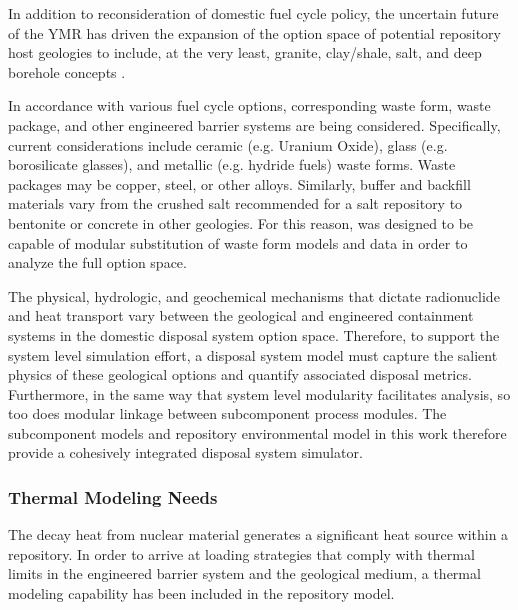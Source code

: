 

In addition to reconsideration of domestic fuel cycle policy, the uncertain 
future of the \gls{YMR} has driven the expansion of the option space of 
potential repository host geologies to include, at the very least, granite, 
clay/shale, salt, and deep borehole concepts \cite{nutt_used_2010}. 


In accordance with various fuel cycle options, corresponding waste form, waste 
package, and other engineered barrier systems are being considered.  
Specifically, current considerations include ceramic (e.g.  Uranium Oxide), 
glass (e.g.  borosilicate glasses), and metallic (e.g.  hydride fuels) waste 
forms. Waste packages may be copper, steel, or other alloys. Similarly, buffer 
and backfill materials vary from the crushed salt recommended for a salt 
repository to bentonite or concrete in other geologies. For this reason, \Cyder
was designed to be capable of modular substitution of waste form models and data
in order to analyze the full option space.


The physical, hydrologic, and geochemical mechanisms that dictate 
radionuclide and heat transport vary between the geological and engineered 
containment systems in the domestic disposal system option space.  Therefore, 
to support the system level simulation effort, a disposal system model must
capture the salient physics of these geological options and quantify associated 
disposal metrics.  Furthermore, in the same way that system level 
modularity facilitates analysis, so too does modular linkage between subcomponent 
process modules. The subcomponent models and repository environmental model in 
this work therefore provide a cohesively integrated disposal system simulator.


\subsubsection{Thermal Modeling Needs}
The decay heat from nuclear material generates a significant heat source within a 
repository. In order to arrive at loading strategies that comply with thermal 
limits in the engineered barrier system and the geological medium, a thermal 
modeling capability has been included in the repository model. 


